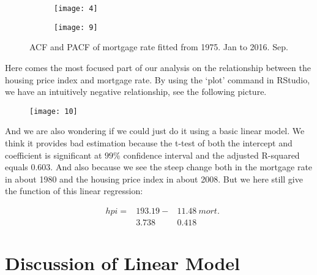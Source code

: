 \documentclass[12pt,letterpaper]{article}
\begin{document}
\begin{figure*}[h!]
\begin{subfigure}[b]{0.4\textwidth}
\begin{center}
 \texttt{[image: 4]}
 \vspace{-0.4cm}
\end{center}
\end{subfigure}
\qquad
\qquad
\begin{subfigure}[b]{0.4\textwidth}
\begin{center}
 \texttt{[image: 9]}
 \vspace{-0.4cm}
\end{center}
\end{subfigure}
 \vspace{-.1cm}
 \caption{ ACF and PACF of mortgage rate fitted from 1975. Jan to 2016. Sep.}
      \label{fig:time}
\vspace{-.25cm}
\end{figure*}

Here comes the most focused part of our analysis on the relationship between the housing price index and mortgage rate. 
By using the `plot' command in RStudio, we have an intuitively negative relationship, see the following picture.

\begin{figure}[h!]
\centering
 \texttt{[image: 10]}\\
\end{figure}

And we are also wondering if we could just do it using a basic linear model. 
We think it provides bad estimation because the t-test of both the intercept and coefficient is significant at $99\%$ confidence interval and the adjusted R-squared equals 0.603. 
And also because we see the steep change both in the mortgage rate in about 1980 and the housing price index in about 2008.
But we here still give the function of this linear regression:

\begin{equation}
\begin{aligned}
&hpi =&193.19  -  &11.48 { \ }mort. \\
&        & 3.738   \quad&0.418
\end{aligned}
\end{equation}

\section{Discussion of Linear Model}
\end{document}
